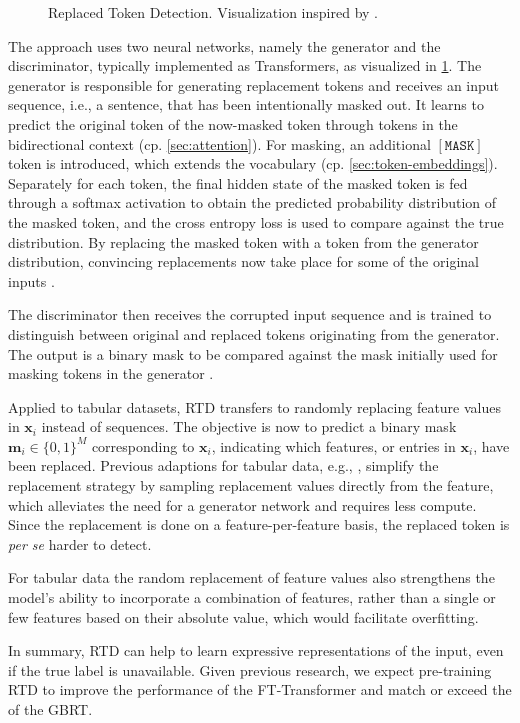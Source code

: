\begin{figure}[ht]
    \centering
    {\renewcommand\normalsize{\small}
        \normalsize
        }
    \caption[Replaced Token Detection]{Replaced Token Detection. Visualization inspired by \textcite[\checkmark][3]{clarkElectraPretrainingText2020}.}
    \label{fig:random-token-replacement}
\end{figure}

The approach uses two neural networks, namely the generator and the discriminator, typically implemented as Transformers, as visualized in \cref{fig:random-token-replacement}.  The generator is responsible for generating replacement tokens and receives an input sequence, i.e., a sentence, that has been intentionally masked out. It learns to predict the original token of the now-masked token through tokens in the bidirectional context (cp. \cref{sec:attention}). For masking, an additional $\mathtt{[MASK]}$ token is introduced, which extends the vocabulary (cp. \cref{sec:token-embeddings}). Separately for each token, the final hidden state of the masked token is fed through a softmax activation to obtain the predicted probability distribution of the masked token, and the cross entropy loss is used to compare against the true distribution. By replacing the masked token with a token from the generator distribution, convincing replacements now take place for some of the original inputs \autocite[\checkmark][2--3]{clarkElectraPretrainingText2020}.

The discriminator then receives the corrupted input sequence and is trained to distinguish between original and replaced tokens originating from the generator. The output is a binary mask to be compared against the mask initially used for masking tokens in the generator \autocite[\checkmark][2--3]{clarkElectraPretrainingText2020}.

Applied to tabular datasets, \gls{RTD} transfers to randomly replacing feature values in $\mathbf{x}_{i}$ instead of sequences. The objective is now to predict a binary mask $\mathbf{m}_{i}\in \{0,1\}^{M}$ corresponding to $\mathbf{x}_{i}$, indicating which features, or entries in $\mathbf{x}_{i}$, have been replaced. Previous adaptions for tabular data, e.g., \textcite[\checkmark][3]{huangTabTransformerTabularData2020}, simplify the replacement strategy by sampling replacement values directly from the feature, which alleviates the need for a generator network and requires less compute. Since the replacement is done on a feature-per-feature basis, the replaced token is \emph{per se} harder to detect.

For tabular data the random replacement of feature values also strengthens the model's ability to incorporate a combination of features, rather than a single or few features based on their absolute value, which would facilitate overfitting.

In summary, \gls{RTD} can help to learn expressive representations of the input, even if the true label is unavailable. Given previous research, we expect pre-training \gls{RTD} to improve the performance of the FT-Transformer and match or exceed the of the \gls{GBRT}.